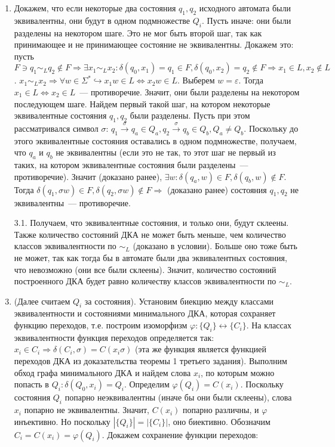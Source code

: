 \documentclass[a4paper]{article}
\begin{document}
\begin{enumerate}[1.]
\item Докажем, что если некоторые два состояния $q_1,q_2$ исходного автомата были эквивалентны, они будут в одном подмножестве $Q_i$. Пусть иначе: они были разделены на некотором шаге.\newline
Это не мог быть второй шаг, так как принимающее и не принимающее состояние не эквивалентны. Докажем это: пусть $F\ni q_1\sim_L q_2\notin F\Rightarrow \exists x_1\sim_L x_2\colon \delta(q_0,x_1)=q_1\in F,\delta(q_0,x_2)=q_2\notin F\Rightarrow x_1\in L,x_2\notin L$. $x_1\sim_L x_2\Rightarrow \forall w\in\Sigma^*\hookrightarrow x_1w\in L\Leftrightarrow x_2w\in L$. Выберем $w=\varepsilon$. Тогда $x_1\in L \Leftrightarrow x_2\in L$~--- противоречие.\newline
Значит, они были разделены на некотором последующем шаге. Найдем первый такой шаг, на котором некоторые эквивалентные состояния $q_1,q_2$ были разделены. Пусть при этом  рассматривался символ $\sigma$: $q_1\overset{\sigma}{\longrightarrow}q_a\in Q_a,q_2\overset{\sigma}{\longrightarrow}q_b\in Q_b,Q_a\neq Q_b$. Поскольку до этого
эквивалентные состояния оставались в одном подмножестве, получаем, что $q_a$ и $q_b$ не эквивалентны (если это не так, то этот шаг не первый из таких, на котором эквивалентные состояния были разделены~--- противоречие). Значит (доказано ранее), $\exists w\colon \delta(q_a,w)\in F,\delta(q_b,w)\notin F$. Тогда $\delta(q_1,\sigma w)\in F,\delta(q_2,\sigma w)\notin F\Rightarrow$ (доказано ранее) состояния $q_1,q_2$ не эквивалентны~--- противоречие.
\item[3.1.] Получаем, что эквивалентные состояния, и только они, будут склеены. Также количество состояний ДКА не может быть меньше, чем количество классов эквивалентности по $\sim_L$ (доказано в условии). Больше оно тоже быть не может, так как тогда бы в автомате были два эквивалентных состояния, что невозможно (они все были склеены). Значит, количество состояний построенного ДКА будет равно количеству классов эквивалентности по $\sim_L$.
\item (Далее считаем $Q_i$ за состояния). Установим биекцию между классами эквивалентности и состояниями минимального ДКА, которая сохраняет функцию переходов, т.е. построим изоморфизм $\varphi\colon \{Q_i\}\leftrightarrow \{C_i\}$. На классах эквивалентности функция переходов определяется так: $x_i\in C_i\Rightarrow \delta(C_i,\sigma)=C(x_i\sigma)$ (эта же функция является функцией переходов ДКА из доказательства теоремы 1 третьего задания). Выполним обход графа минимального ДКА и найдем слова $x_i$, по которым можно попасть в $Q_i\colon \delta(Q_0,x_i)=Q_i$. Определим $\varphi(Q_i)=C(x_i)$. Поскольку состояния $Q_i$ попарно неэквивалентны (иначе бы они были склеены), слова $x_i$ попарно не эквивалентны. Значит, $C(x_i)$ попарно различны, и $\varphi$ инъективно. Но поскольку $|\{Q_i\}|=|\{C_i\}|$, оно биективно. Обозначим $C_i=C(x_i)=\varphi(Q_i)$. Докажем сохранение функции переходов:\newline

\end{enumerate}
\end{document}
